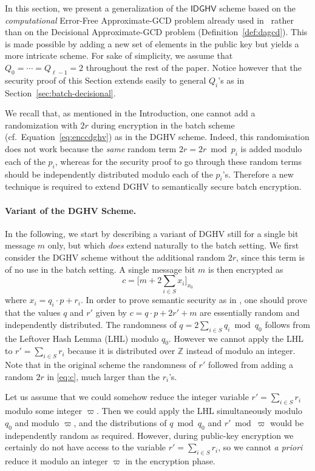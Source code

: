 \documentclass[11pt]{llncs}
\newcommand*{\CDGHV}{\ensuremath{\mathsf{IDGHV}}}
\begin{document}
In this section, we present a generalization of the $\CDGHV$ scheme based on 
the \emph{computational} Error-Free Approximate-GCD problem already used 
in~\cite{vDGHV2010,CMNT2011,CNT2012} rather than on the Decisional 
Approximate-GCD problem (Definition~\ref{def:dagcd}). This is made possible 
by adding a new set of elements in the public key but yields a more intricate 
scheme. For sake of simplicity, we assume that $Q_0=\cdots=Q_{\ell-1}=2$ 
throughout the rest of the paper. Notice however that the security proof of 
this Section extends easily to general $Q_i$'s as in Section~\ref{sec:batch-decisional}.

We recall that, as mentioned in the Introduction, one cannot add a
randomization with $2r$ during encryption in the batch scheme (cf.~Equation~\eqref{eq:enccdghv}) as in the DGHV scheme. Indeed, this randomisation does not work because the \emph{same} random term $2r=2r \bmod p_i$ is added
modulo each of the $p_i$, whereas for the security proof to go through
these random terms should be independently distributed modulo each of the
$p_i$'s. Therefore a new technique is required to extend DGHV to
semantically secure batch encryption.

\paragraph{Variant of the DGHV Scheme.} In the following, we start by describing a variant of DGHV still for a
single bit message $m$ only, but which \emph{does} extend naturally to the
batch setting. We first consider the DGHV scheme without the additional
random $2r$, since this term is of no use in the batch setting. A single
message bit $m$ is then encrypted as
\[
    c = \Big[m + 2\sum\limits_{i\in S} x_i\Big]_{x_0}
\]
where $x_i=q_i \cdot p+r_i$. In order to prove semantic security as in
\cite{vDGHV2010}, one should prove that the values $q$ and $r'$ given by
$c=q \cdot p+2r'+m$ are essentially random and independently distributed.
The randomness of $q=2\sum_{i \in S} q_i \bmod q_0$ follows from the
Leftover Hash Lemma (LHL) modulo $q_0$. However we cannot apply the LHL
to $r'=\sum_{i \in S} r_i$ because it is distributed over ${\mathbb Z}$
instead of modulo an integer. Note that in the original scheme the
randomness of $r'$ followed from adding a random $2r$ in \eqref{eq:c},
much larger than the $r_i$'s.

Let us assume that we could somehow reduce the integer variable
$r'=\sum_{i \in S} r_i$ modulo some integer $\varpi$. Then we could apply
the LHL simultaneously modulo $q_0$ and modulo $\varpi$, and the
distributions of $q \bmod q_0$ and $r' \bmod \varpi$ would be
independently random as required. However, during public-key encryption
we certainly do not have access to the variable $r'=\sum_{i \in S} r_i$,
so we cannot \emph{a priori} reduce it modulo an integer $\varpi$ in the
encryption phase.
\end{document}

